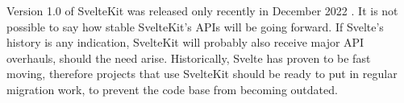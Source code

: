 Version 1.0 of SvelteKit was released only recently in December 2022 \cite{team_announcing_2022}. It is not possible to say how stable SvelteKit's APIs will be going forward. If Svelte's history is any indication, SvelteKit will probably also receive major API overhauls, should the need arise. Historically, Svelte has proven to be fast moving, therefore projects that use SvelteKit should be ready to put in regular migration work, to prevent the code base from becoming outdated.
